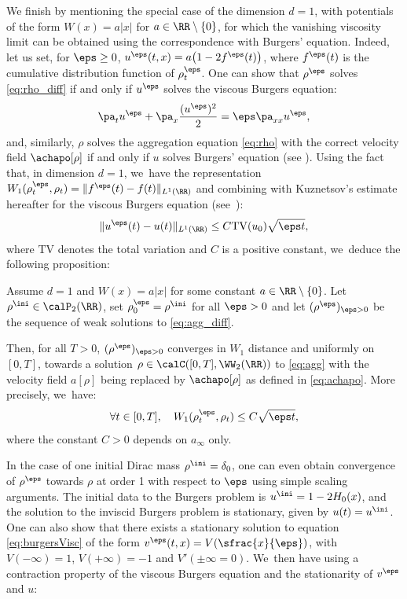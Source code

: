 We finish by mentioning the special case of the dimension $d = 1$, with potentials of the form $W(x) = a|x|$ for $a\in\RR \setminus \{0\}$, for which the vanishing viscosity limit can be obtained using the correspondence with Burgers' equation. Indeed, let us set, for $\eps \geq 0$, $u^\eps(t,x) = a\big(1 - 2 f^\eps(t)\big)$, where $f^\eps(t)$ is the cumulative distribution function of $\rho^\eps_t$. One can show that $\rho^\eps$ solves \eqref{eq:rho_diff} if and only if $u^\eps$ solves the viscous Burgers equation:
\begin{equation}\label{eq:burgersVisc}
\pa_t u^\eps + \pa_x \frac{(u^\eps)^2}{2} = \eps \pa_{xx} u^\eps,
\end{equation}
and, similarly, $\rho$ solves the aggregation equation \eqref{eq:rho} with the correct velocity field $\achapo[\rho]$ if and only if $u$ solves Burgers' equation (see \cite{bonaschi13, relax21, jv15}). Using the fact that, in dimension $d=1$, we~have the representation $W_1(\rho^\eps_t, \rho_t) = \|f^\eps(t) - f(t)\|_{L^1(\RR)}$ and combining with Kuznetsov's estimate hereafter for the viscous Burgers equation (see~\cite{kuznetsov76}):
\[
\|u^\eps(t) - u(t)\|_{L^1(\RR)} \leq C \mathrm{TV}(u_0) \sqrt{\eps t},
\]
where $\mathrm{TV}$ denotes the total variation and $C$ is a positive constant, we~deduce the following proposition:
\begin{prop}\label{prop:cvViaBurgers}
Assume $d=1$ and $W(x) = a|x|$ for some constant $a\in \RR \setminus \{0\}$. Let $\rho^{\ini} \in \calP_2(\RR)$, set $\rho_0^\eps = \rho^{\ini}$ for all $\eps>0$ and let $(\rho^\eps)_{\eps > 0}$ be the sequence of weak solutions to \eqref{eq:agg_diff}.

Then, for all $T>0$, $(\rho^\eps)_{\eps > 0}$ converges in $W_1$ distance and uniformly on $[0,T]$, towards a solution $\rho \in \calC([0,T], \WW _2(\RR))$ to \eqref{eq:agg} with the velocity field $a[\rho]$ being replaced by $\achapo[\rho]$ as defined in \eqref{eq:achapo}. More precisely, we~have:
\[
\forall t \in [0,T], \quad W_1(\rho_t^\eps, \rho_t) \leq C \sqrt{\eps t},
\]
where the constant $C>0$ depends on $a_\infty$ only.
\end{prop}
In the case of one initial Dirac mass $\rho^{\ini} = \delta_0$, one can even obtain convergence of $\rho^\eps$ towards $\rho$ at order 1 with respect to $\eps$ using simple scaling arguments. The initial data to the Burgers problem is $u^{\ini} = 1 - 2H_0(x)$, and the solution to the inviscid Burgers problem is stationary, given by $u(t) = u^{\ini}$. One can also show that there exists a stationary solution to equation \eqref{eq:burgersVisc} of the form $v^\eps(t,x) = V(\sfrac{x}{\eps})$, with $V(-\infty) = 1$, $V(+\infty) = -1$ and $V'(\pm\infty = 0)$. We~then have using a contraction property of the viscous Burgers equation and the stationarity of $v^\eps$ and $u$:
